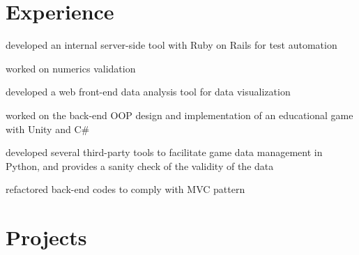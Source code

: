 \documentclass[]{deedy-resume-openfont}
\begin{document}
\begin{minipage}[t]{0.66\textwidth} 


\section{Experience}

\vspace{\topsep} %
\begin{tightemize} 
\item developed an internal server-side tool with Ruby on Rails for test automation
\item worked on numerics validation
\item developed a web front-end data analysis tool for data visualization
\end{tightemize}
\sectionsep

\begin{tightemize} 
\item worked on the back-end OOP design and implementation of an educational game with Unity and C\#
\item developed several third-party tools to facilitate game data management in Python, and provides a sanity check of the validity of the data
\item refactored back-end codes to comply with MVC pattern
\end{tightemize}
\sectionsep



\section{Projects}


\end{minipage}
\end{document}
